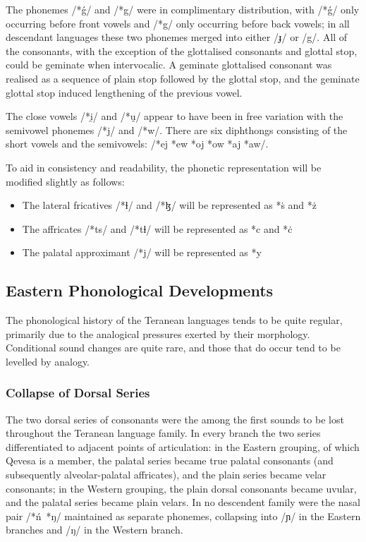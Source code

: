 \documentclass[grammar]{subfiles}
\begin{document}
The phonemes /*ǵ/ and /*g/ were in complimentary distribution, with /*ǵ/ only
occurring before front vowels and /*g/ only occurring before back vowels; in
all descendant languages these two phonemes merged into either /ɟ/ or /g/.  All
of the consonants, with the exception of the glottalised consonants and glottal
stop, could be geminate when intervocalic.  A geminate glottalised consonant
was realised as a sequence of plain stop followed by the glottal stop, and the
geminate glottal stop induced lengthening of the previous vowel.

The close vowels /*i̯/ and /*u̯/ appear to have been in free variation with the
semivowel phonemes /*j/ and /*w/.  There are six diphthongs consisting of the
short vowels and the semivowels: /*ej *ew *oj *ow *aj *aw/.

To aid in consistency and readability, the phonetic representation will be
modified slightly as follows:

\begin{itemize}
  \item The lateral fricatives /*ɬ/ and /*ɮ/ will be represented as *ṡ and *ż
  \item The affricates /*ts/ and /*tɬ/ will be represented as *c and *ċ
  \item The palatal approximant /*j/ will be represented as *y
\end{itemize}

\subsection{Eastern Phonological Developments}
\label{ssec:history:eastern_developments}

The phonological history of the Teranean languages tends to be quite regular,
primarily due to the analogical pressures exerted by their morphology.
Conditional sound changes are quite rare, and those that do occur tend to be
levelled by analogy.

\subsubsection{Collapse of Dorsal Series}
\label{sssec:history:east:dorsal_consonants}

The two dorsal series of consonants were the among the first sounds to be lost
throughout the Teranean language family.  In every branch the two series
differentiated to adjacent points of articulation: in the Eastern grouping, of
which Qevesa is a member, the palatal series became true palatal consonants
(and subsequently alveolar-palatal affricates), and the plain series became
velar consonants; in the Western grouping, the plain dorsal consonants became
uvular, and the palatal series became plain velars.  In no descendent family
were the nasal pair /*ń~*ŋ/ maintained as separate phonemes, collapsing into
/ɲ/ in the Eastern branches and /ŋ/ in the Western branch.
\end{document}
